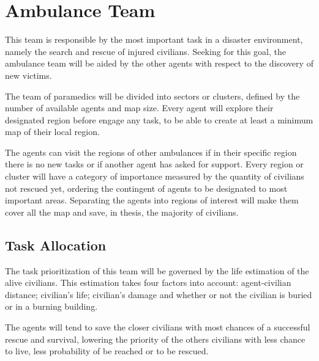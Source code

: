 \section{Ambulance Team}
\label{sec:ambulance}

This team is responsible by the most important task in a disaster environment, namely the search and rescue of injured civilians. Seeking for this goal, the ambulance team will be aided by the other agents with respect to the discovery of new victims.

The team of paramedics will be divided into sectors or clusters, defined by the number of available agents and map size. Every agent will explore their designated region before engage any task, to be able to create at least a minimum map of their local region. 

The agents can visit the regions of other ambulances if in their specific region there is no new tasks or if another agent has asked for support. Every region or cluster will have a category of importance measured by the quantity of civilians not rescued yet, ordering the contingent of agents to be designated to most important areas. Separating the agents into regions of interest will make them cover all the map and save, in thesis, the majority of civilians.


\subsection{Task Allocation}

The task prioritization of this team will be governed by the life estimation of the alive civilians. This estimation takes four factors into account: agent-civilian distance; civilian's life; civilian's damage and whether or not the civilian is buried or in a burning building.

The agents will tend to save the closer civilians with most chances of a successful rescue and survival, lowering the priority of the others civilians with less chance to live, less probability of be reached or to be rescued.

